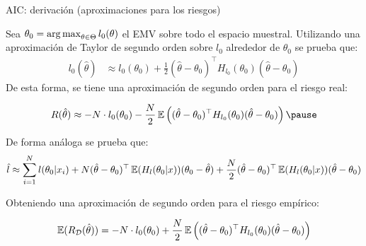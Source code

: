 \documentclass[9pt]{beamer}
\begin{document}
\begin{frame}{AIC: derivación (aproximaciones para los riesgos)}

Sea $\theta_0 = \operatorname*{arg\,max}_{\theta\in\Theta} l_0(\theta)$ el EMV sobre todo el espacio muestral. Utilizando una aproximación de Taylor de segundo orden sobre $l_0$ alrededor de $\theta_0$ se prueba que:
\begin{align*}
	l_0(\hat{\theta})&\approx l_0(\theta_0) + \frac{1}{2}(\hat{\theta}-\theta_0)^\top H_{l_0}(\theta_0) (\hat{\theta}-\theta_0)
\end{align*}\pause
De esta forma, se tiene una aproximación de segundo orden para el riesgo real:

\begin{equation*}
	R(\hat{\theta}) \approx -N \cdot l_0(\theta_0) - \frac{N}{2}\E\left((\hat{\theta}-\theta_0)^\top H_{l_0}(\theta_0) (\hat{\theta}-\theta_0)\right)\pause
\end{equation*}

De forma análoga se prueba que:
\begin{equation*}
	\hat{l} \approx \sum_{i=1}^N l(\theta_0|x_i) + N(\hat{\theta}-\theta_0)^\top \operatorname{\mathbb{E}}(H_l(\theta_0|x)) (\theta_0-\hat{\theta}) + \frac{N}{2}(\hat{\theta}-\theta_0)^\top \operatorname{\mathbb{E}}(H_l(\theta_0|x)) (\hat{\theta}-\theta_0)
\end{equation*}\pause

Obteniendo una aproximación de segundo orden para el riesgo empírico:

\begin{equation*}
	\operatorname{\mathbb{E}}(R_{\mathcal D}(\hat{\theta})) = -N\cdot l_0(\theta_0) + \frac{N}{2} \operatorname{\mathbb{E}}\left((\hat{\theta}-\theta_0)^\top H_{l_0}(\theta_0) (\hat{\theta}-\theta_0)\right)
\end{equation*}

	
\end{frame}
\end{document}
